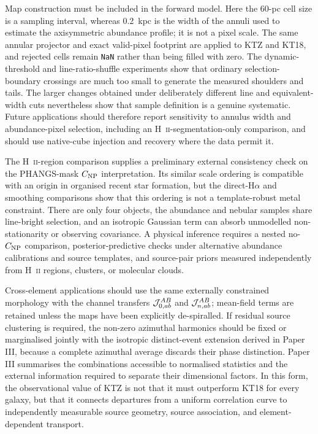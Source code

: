 \documentclass[fleqn,usenatbib]{mnras}
\begin{document}
Map construction must be included in the forward model.  Here the 60-pc cell size is a sampling interval, whereas 0.2~kpc is the width of the annuli used to estimate the axisymmetric abundance profile; it is not a pixel scale.  The same annular projector and exact valid-pixel footprint are applied to KTZ and KT18, and rejected cells remain \texttt{NaN} rather than being filled with zero.  The dynamic-threshold and line-ratio-shuffle experiments show that ordinary selection-boundary crossings are much too small to generate the measured shoulders and tails.  The larger changes obtained under deliberately different line and equivalent-width cuts nevertheless show that sample definition is a genuine systematic.  Future applications should therefore report sensitivity to annulus width and abundance-pixel selection, including an H~\textsc{ii}-segmentation-only comparison, and should use native-cube injection and recovery where the data permit it.

The H~\textsc{ii}-region comparison supplies a preliminary external consistency check on the PHANGS-mask $C_{\rm NP}$ interpretation.  Its similar scale ordering is compatible with an origin in organised recent star formation, but the direct-H$\alpha$ and smoothing comparisons show that this ordering is not a template-robust metal constraint.  There are only four objects, the abundance and nebular samples share line-bright selection, and an isotropic Gaussian term can absorb unmodelled non-stationarity or observing covariance.  A physical inference requires a nested no-$C_{\rm NP}$ comparison, posterior-predictive checks under alternative abundance calibrations and source templates, and source-pair priors measured independently from H~\textsc{ii} regions, clusters, or molecular clouds.

Cross-element applications should use the same externally constrained morphology with the channel transfers ${\cal J}_{0,ab}^{AB}$ and ${\cal J}_{n,ab}^{AB}$; mean-field terms are retained unless the maps have been explicitly de-spiralled.  If residual source clustering is required, the non-zero azimuthal harmonics should be fixed or marginalised jointly with the isotropic distinct-event extension derived in Paper III, because a complete azimuthal average discards their phase distinction.  Paper III summarises the combinations accessible to normalised statistics and the external information required to separate their dimensional factors.  In this form, the observational value of KTZ is not that it must outperform KT18 for every galaxy, but that it connects departures from a uniform correlation curve to independently measurable source geometry, source association, and element-dependent transport.
\end{document}

